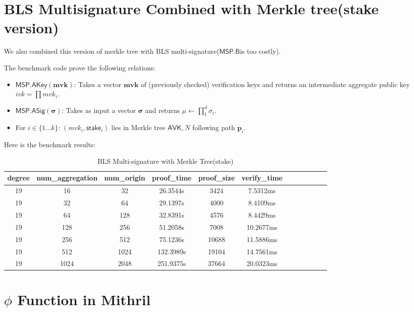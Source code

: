 \documentclass{article}
\begin{document}
\section{BLS Multisignature Combined with Merkle tree(stake version)}

We also combined this version of merkle tree with BLS multi-signature($\mathsf{MSP.B}$is too costly).

The benchmark code prove the following relations:

\begin{itemize}
    \item $\mathsf{MSP.AKey}(\textbf{mvk})$: Takes a vector $\textbf{mvk}$ of (previously checked) verification keys and returns an intermediate aggregate public key
    $ivk=\prod mvk_i$.
    \item  $\mathsf{MSP.ASig}(\bm{\sigma})$: Takes as input a vector $\bm{\sigma}$ and returns $\mu \leftarrow \prod_{1}^d \sigma_i$.
    \item For $i \in \{1 \dots k\}$: $(mvk_i, \mathsf{stake}_i)$ lies in Merkle tree $\mathsf{AVK}, N$ following path $\bm{p}_i$.
\end{itemize}


Here is the benchmark results:


\begin{table}[h!]
\centering
\begin{tabular}{|c|c|c|c|c|c|c|c|c|c|c|c|}
\hline
\textbf{degree}    & \textbf{num\_aggregation} & \textbf{num\_origin} & \textbf{proof\_time} & \textbf{proof\_size} & \textbf{verify\_time} \\ \hline
19  & 16 & 32 & 26.3544s & 3424 & 7.5312ms \\ \hline
19  & 32 & 64 & 29.1397s & 4000 & 8.4109ms \\ \hline
19  & 64 & 128 & 32.8391s & 4576 & 8.4429ms \\ \hline
19  & 128 & 256 & 51.2058s & 7008 & 10.2677ms \\ \hline
19  & 256 & 512 & 75.1236s & 10688 & 11.5886ms \\ \hline
19  & 512 & 1024 & 132.3989s & 19104 & 14.7561ms \\ \hline
19  & 1024 & 2048 & 251.9375s & 37664 & 20.0323ms \\ \hline
\end{tabular}
\caption{BLS Multi-signature with Merkle Tree(stake)}
\label{tab:data_table}
\end{table}


\section{$\phi$ Function in Mithril}
\end{document}
